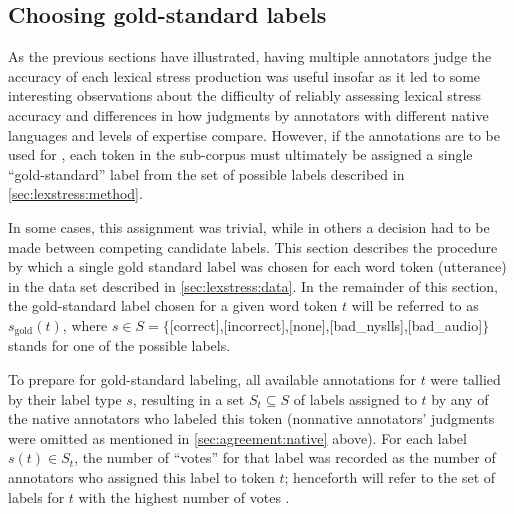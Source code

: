 			
			
		\subsection{Choosing gold-standard labels }
		\label{sec:agreement:gold}
		
		
		As the previous sections have illustrated, having multiple annotators judge the accuracy of each lexical stress production was useful insofar as it led to some interesting observations about the difficulty of reliably assessing lexical stress accuracy and differences in how judgments by annotators with different native languages and levels of expertise compare. However, if the annotations are to be used for , each token in the sub-corpus must ultimately be assigned a single ``gold-standard'' label from the set of possible labels described in \cref{sec:lexstress:method}.
		
		In some cases, this assignment was trivial, while in others a decision had to be made between competing candidate labels. This section describes the procedure by which a single gold standard label was chosen for each word token (utterance) in the data set described in \cref{sec:lexstress:data}. In the remainder of this section, the gold-standard label chosen for a given word token $t$ will be referred to as $s_{\text{gold}}(t)$, where $s \in S = \{$[correct],{[incorrect]},{[none]},{[bad\_nyslls]},{[bad\_audio]}$\}$ stands for one of the possible labels.
		
		To prepare for gold-standard labeling, all available annotations for $t$ were tallied by their label type $s$, resulting in a set $S_t \subseteq S$ of labels assigned to $t$ by any of the native annotators who labeled this token (nonnative annotators' judgments were omitted as mentioned in \cref{sec:agreement:native} above). For each label $s(t) \in S_t$, the number of ``votes'' for that label was recorded as the number of annotators who assigned this label to token $t$; henceforth  will refer to the set of labels for $t$ with the highest number of votes .
		
